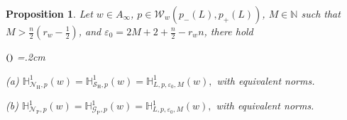 \documentclass[11pt, a4paper,leqno]{amsart}
\theoremstyle{plain}
\newtheorem{proposition}[equation]{Proposition}
\theoremstyle{definition}
\theoremstyle{remark}
\numberwithin{equation}{section}
\def \N{ \mathbb{N} }
\def \Scal{ \mathcal{S} }
\def \hh{ \mathrm{H} }
\def \pp{ \mathrm{P} }
\def \Gcal { \mathcal{G} }
\def \Ncal { \mathcal{N} }
\begin{document}
\begin{proposition}\label{lemma:hardy-N}
Let $w\in A_{\infty}$, $p\in \mathcal{W}_w(p_-(L),p_+(L))$, $M\in \N$ such that $M>\frac{n}{2}\left(r_w-\frac{1}{2}\right)$, and $\varepsilon_0=2M+2+\frac{n}{2}-r_wn$, there hold
\begin{list}{$(\theenumi)$}{\leftmargin=1cm \itemsep=0.2cm\topsep=.2cm \renewcommand{\theenumi}{\alph{enumi}}}



\item[(a)]$
\mathbb{H}^1_{\Ncal_{\hh},p}(w)=\mathbb{H}^1_{\Scal_{\hh},p}(w)= \mathbb{H}^1_{L,p,\varepsilon_0, M}(w),
$
 with equivalent norms.


\item[(b)]
$
\mathbb{H}^1_{\Ncal_{\pp},p}(w)=\mathbb{H}^1_{\Gcal_{\pp},p}(w)= \mathbb{H}^1_{L,p,\varepsilon_0, M}(w),
$
 with equivalent norms.
\end{list}
\end{proposition}
\end{document}
